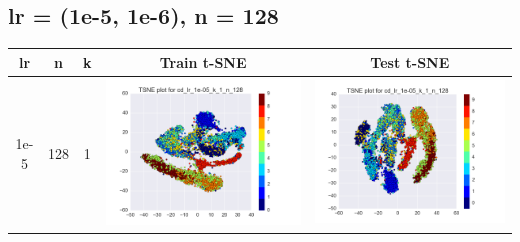 \documentclass[12pt]{report}
\begin{document}
\subsection{lr = (1e-5, 1e-6), n = 128}

\begin{table}[H]
  \centering
  \begin{tabular}{ | c | c | c | c || c |}
    \hline
    \textbf{lr} & \textbf{n} & \textbf{k} & \textbf{Train t-SNE} & \textbf{Test t-SNE} \\ \hline
    1e-5 & 128 & 1 &
    \begin{minipage}{.3\textwidth}
      \includegraphics[scale=0.25]{cd_lr_1e-05_k_1_n_128.png}
    \end{minipage} &
    \begin{minipage}{.3\textwidth}
      \includegraphics[scale=0.25]{test_cd_lr_1e-05_k_1_n_128.png}

\end{minipage}
\end{tabular}
\end{table}
\end{document}
